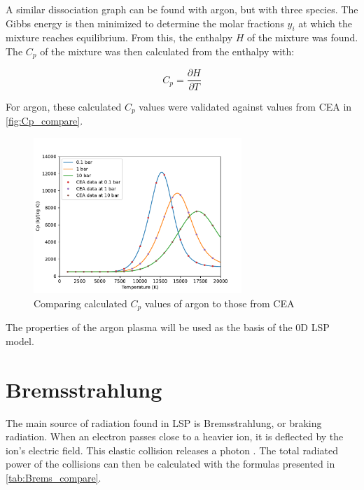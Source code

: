         A similar dissociation graph can be found with argon, but with three species. The Gibbs energy is then minimized to determine the molar fractions $y_i$ at which the mixture reaches equilibrium. From this, the enthalpy $H$ of the mixture was found. The $C_p$ of the mixture was then calculated from the enthalpy with:

        \begin{equation}
            C_p = \frac{\partial H}{\partial T}
        \end{equation}
        
        For argon, these calculated $C_p$ values were validated against values from CEA \cite{CEARUNRev4} in \autoref{fig:Cp_compare}.
        
        \begin{figure}[!ht]
            \centering
            \includegraphics[width=0.7\textwidth]{assets/2 models/Cp_compare.pdf}
            \caption{Comparing calculated $C_p$ values of argon to those from CEA}
            \label{fig:Cp_compare}
        \end{figure}

        The properties of the argon plasma will be used as the basis of the 0D LSP model.
    
    \section{Bremsstrahlung}
        
        The main source of radiation found in LSP is Bremsstrahlung, or braking radiation. When an electron passes close to a heavier ion, it is deflected by the ion's electric field. This elastic collision releases a photon . The total radiated power of the collisions can then be calculated with the formulas presented in \autoref{tab:Brems_compare}.

